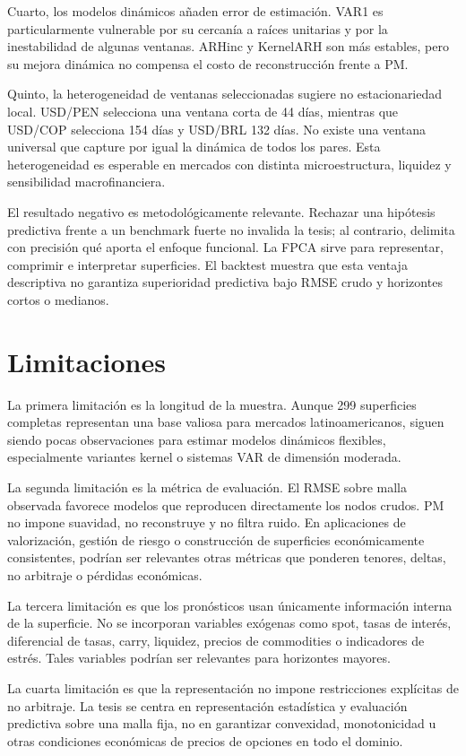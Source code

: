 \documentclass[12pt,a4paper]{article}
\begin{document}
Cuarto, los modelos dinámicos añaden error de estimación. VAR1 es particularmente vulnerable por su cercanía a raíces unitarias y por la inestabilidad de algunas ventanas. ARHinc y KernelARH son más estables, pero su mejora dinámica no compensa el costo de reconstrucción frente a PM.

Quinto, la heterogeneidad de ventanas seleccionadas sugiere no estacionariedad local. USD/PEN selecciona una ventana corta de 44 días, mientras que USD/COP selecciona 154 días y USD/BRL 132 días. No existe una ventana universal que capture por igual la dinámica de todos los pares. Esta heterogeneidad es esperable en mercados con distinta microestructura, liquidez y sensibilidad macrofinanciera.

El resultado negativo es metodológicamente relevante. Rechazar una hipótesis predictiva frente a un benchmark fuerte no invalida la tesis; al contrario, delimita con precisión qué aporta el enfoque funcional. La FPCA sirve para representar, comprimir e interpretar superficies. El backtest muestra que esta ventaja descriptiva no garantiza superioridad predictiva bajo RMSE crudo y horizontes cortos o medianos.

\section{Limitaciones}

La primera limitación es la longitud de la muestra. Aunque 299 superficies completas representan una base valiosa para mercados latinoamericanos, siguen siendo pocas observaciones para estimar modelos dinámicos flexibles, especialmente variantes kernel o sistemas VAR de dimensión moderada.

La segunda limitación es la métrica de evaluación. El RMSE sobre malla observada favorece modelos que reproducen directamente los nodos crudos. PM no impone suavidad, no reconstruye y no filtra ruido. En aplicaciones de valorización, gestión de riesgo o construcción de superficies económicamente consistentes, podrían ser relevantes otras métricas que ponderen tenores, deltas, no arbitraje o pérdidas económicas.

La tercera limitación es que los pronósticos usan únicamente información interna de la superficie. No se incorporan variables exógenas como spot, tasas de interés, diferencial de tasas, carry, liquidez, precios de commodities o indicadores de estrés. Tales variables podrían ser relevantes para horizontes mayores.

La cuarta limitación es que la representación no impone restricciones explícitas de no arbitraje. La tesis se centra en representación estadística y evaluación predictiva sobre una malla fija, no en garantizar convexidad, monotonicidad u otras condiciones económicas de precios de opciones en todo el dominio.
\end{document}

